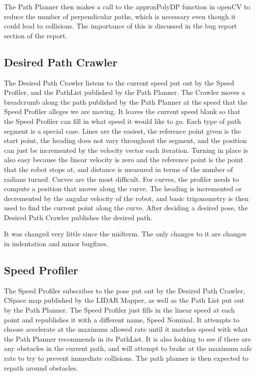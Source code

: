 \documentclass{article}
\begin{document}
The Path Planner then makes a call to the approxPolyDP function in openCV to reduce the number of perpendicular paths, which is necessary even though it could lead to collisions.
The importance of this is discussed in the bug report section of the report.

\subsection{Desired Path Crawler}

The Desired Path Crawler listens to the current speed put out by the Speed Profiler, and the PathList published by the Path Planner.
The Crawler moves a breadcrumb along the path published by the Path Planner at the speed that the Speed Profiler alleges we are moving.
It leaves the current speed blank so that the Speed Profiler can fill in what speed it would like to go.
Each type of path segment is a special case.
Lines are the easiest, the reference point given is the start point, the heading does not vary throughout the segment, and the position can just be incremented by the velocity vector each iteration.
Turning in place is also easy because the linear velocity is zero and the reference point is the point that the robot stops at, and distance is measured in terms of the number of radians turned.
Curves are the most difficult. 
For curves, the profiler needs to compute a position that moves along the curve. 
The heading is incremented or decremented by the angular velocity of the robot, and basic trigonometry is then used to find the current point along the curve.
After deciding a desired pose, the Desired Path Crawler publishes the desired path.

It was changed very little since the midterm. The only changes to it are changes in indentation and minor bugfixes.


\subsection{Speed Profiler}

The Speed Profiler subscribes to the pose put out by the Desired Path Crawler, CSpace map published by the LIDAR Mapper, as well as the Path List put out by the Path Planner.
The Speed Profiler just fills in the linear speed at each point and republishes it with a different name, Speed Nominal.
It attempts to choose accelerate at the maximum allowed rate until it matches speed with what the Path Planner recommends in its PathList.
It is also looking to see if there are any obstacles in the current path, and will attempt to brake at the maximum safe rate to try to prevent immediate collisions.
The path planner is then expected to repath around obstacles.
\end{document}
